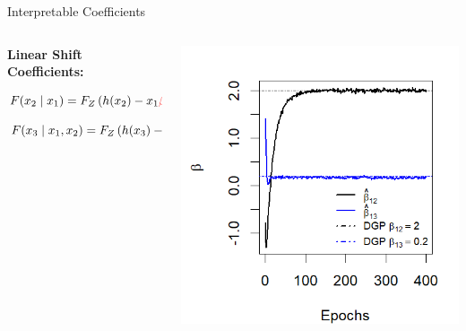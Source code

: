 \documentclass[onlytextwidth,english]{beamer}\usepackage[]{graphicx}\usepackage[]{xcolor}
\begin{document}
\begin{frame}{Interpretable Coefficients}

\begin{columns}

\begin{column}{0.42\textwidth}

\textbf{Linear Shift Coefficients:}

\vspace{0.2cm}

{\scriptsize
\[
F(x_2 \mid x_1) = F_Z\left(h(x_2) - x_1 \textcolor{red}{\beta_{12}}\right)
\]


\[
F(x_3 \mid x_1, x_2) = F_Z\left(h(x_3) - x_1 \textcolor{red}{\beta_{13}} - CS_{x_2}\right)
\]
}

\end{column}

\begin{column}{0.58\textwidth}

\includegraphics[width=\linewidth]{img/Betas.png}

\end{column}

\end{columns}

\end{frame}
\end{document}
